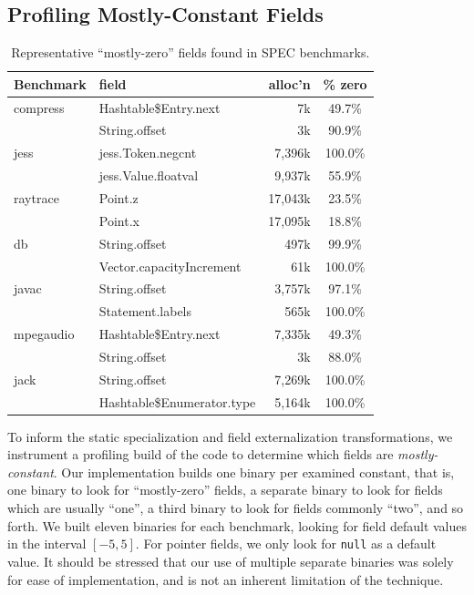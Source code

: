 \documentclass{sig-alt-full}
\begin{document}
\subsection{Profiling Mostly-Constant Fields}
\begin{table}[t]
\centering\small
\begin{tabular}{llrc}
\bf Benchmark &\bf field &\bf alloc'n &\bf \% zero \\ \hline
compress   & Hashtable\$Entry.next & 7k & 49.7\% \\
           & String.offset & 3k & 90.9\% \\
jess       & jess.Token.negcnt & 7,396k & 100.0\% \\
           & jess.Value.floatval & 9,937k & 55.9\% \\
raytrace   & Point.z & 17,043k & 23.5\% \\
           & Point.x & 17,095k & 18.8\% \\
db         & String.offset & 497k & 99.9\% \\
           & Vector.capacityIncrement & 61k & 100.0\% \\
javac      & String.offset & 3,757k & 97.1\% \\
           & Statement.labels & 565k & 100.0\% \\
mpegaudio  & Hashtable\$Entry.next & 7,335k & 49.3\% \\
           & String.offset & 3k & 88.0\% \\
jack       & String.offset & 7,269k & 100.0\% \\
           & Hashtable\$Enumerator.type & 5,164k & 100.0\% \\
\end{tabular}
\caption{Representative ``mostly-zero'' fields found in SPEC
           benchmarks.
}
\label{tab:mostly-zero}
\end{table}
To inform the static specialization and field externalization
transformations, we instrument a profiling build of the code
to determine which fields are {\it mostly-constant}.  Our implementation
builds one binary per examined constant, that is, one binary to look
for ``mostly-zero'' fields, a separate binary to look for fields which
are usually ``one'', a third binary to look for fields commonly
``two'', and so forth.  We built eleven binaries for each benchmark,
looking for
field default values in the interval $[-5,5]$.
For pointer fields, we only look for {\tt null} as a default value.
It should be stressed that our use of multiple separate binaries was
solely for ease of implementation, and is not an inherent limitation
of the technique.
\end{document}
